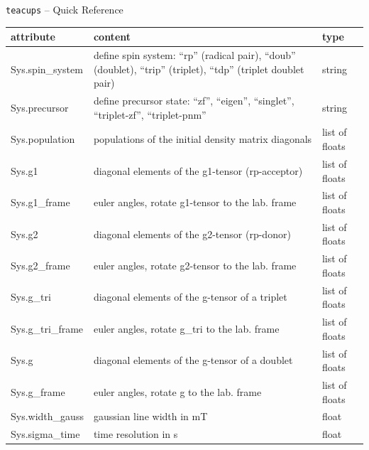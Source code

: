 \documentclass[a4paper,12pt]{scrartcl}
\begin{document}
\begin{Large}
\begin{center}
\texttt{teacups} -- Quick Reference
\end{center}
\end{Large}

\begin{xltabular}{\linewidth}{lXl}
\toprule
attribute & content & type \\
\midrule
\endhead
Sys.spin\_system & define spin system: \enquote{rp} (radical pair), \enquote{doub} (doublet), \enquote{trip} (triplet), \enquote{tdp} (triplet doublet pair) & string \\
Sys.precursor & define precursor state: \enquote{zf}, \enquote{eigen}, \enquote{singlet}, \enquote{triplet-zf}, \enquote{triplet-pnm}  & string\\
Sys.population & populations of the initial density matrix diagonals & list of floats\\

\midrule

Sys.g1 & diagonal elements of the g1-tensor (rp-acceptor) & list of floats \\
Sys.g1\_frame & euler angles, rotate g1-tensor to the lab. frame & list of floats\\
Sys.g2 & diagonal elements of the g2-tensor (rp-donor) & list of floats \\
Sys.g2\_frame & euler angles, rotate g2-tensor to the lab. frame & list of floats\\
Sys.g\_tri & diagonal elements of the g-tensor of a triplet & list of floats\\
Sys.g\_tri\_frame & euler angles, rotate g\_tri to the lab. frame & list of floats\\
Sys.g & diagonal elements of the g-tensor of a doublet & list of floats\\
Sys.g\_frame & euler angles, rotate g to the lab. frame & list of floats\\
Sys.width\_gauss & gaussian line width in mT & float\\
Sys.sigma\_time & time resolution in s & float \\
\midrule


\end{xltabular}
\end{document}
